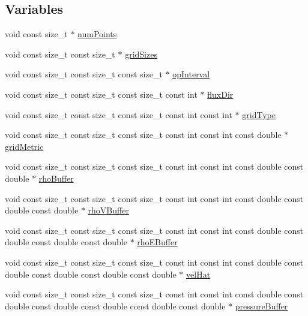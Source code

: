 \subsection*{Variables}
\begin{DoxyCompactItemize}
\item 
void const size\+\_\+t $\ast$ \hyperlink{EulerKernels_8H_a26ea64bf27e81d41692232b2b97160c3}{num\+Points}
\item 
void const size\+\_\+t const size\+\_\+t $\ast$ \hyperlink{EulerKernels_8H_a25a65154b8b8819da9bf4e0ecef40fa1}{grid\+Sizes}
\item 
void const size\+\_\+t const size\+\_\+t const size\+\_\+t $\ast$ \hyperlink{EulerKernels_8H_a213a90a5a4736a5c5fc0c0220cdcb661}{op\+Interval}
\item 
void const size\+\_\+t const size\+\_\+t const size\+\_\+t const int $\ast$ \hyperlink{EulerKernels_8H_ab29bdde281c96d3ace8c96f53cea3e7e}{flux\+Dir}
\item 
void const size\+\_\+t const size\+\_\+t const size\+\_\+t const int const int $\ast$ \hyperlink{EulerKernels_8H_af99bcb504c360b791c023e906710851c}{grid\+Type}
\item 
void const size\+\_\+t const size\+\_\+t const size\+\_\+t const int const int const double $\ast$ \hyperlink{EulerKernels_8H_a50e8052dd93fbd0508409959216200f9}{grid\+Metric}
\item 
void const size\+\_\+t const size\+\_\+t const size\+\_\+t const int const int const double const double $\ast$ \hyperlink{EulerKernels_8H_a3b7eb563e35c212b5ad0d1fdfd72d1dd}{rho\+Buffer}
\item 
void const size\+\_\+t const size\+\_\+t const size\+\_\+t const int const int const double const double const double $\ast$ \hyperlink{EulerKernels_8H_a7c23aa68122eb669ea5c4afb5a53e7cf}{rho\+V\+Buffer}
\item 
void const size\+\_\+t const size\+\_\+t const size\+\_\+t const int const int const double const double const double const double $\ast$ \hyperlink{EulerKernels_8H_a7415fc29d2ee252183df8b0d418b92af}{rho\+E\+Buffer}
\item 
void const size\+\_\+t const size\+\_\+t const size\+\_\+t const int const int const double const double const double const double const double $\ast$ \hyperlink{EulerKernels_8H_af5e2f538d36775c7fb6d1dea9380ecde}{vel\+Hat}
\item 
void const size\+\_\+t const size\+\_\+t const size\+\_\+t const int const int const double const double const double const double const double const double $\ast$ \hyperlink{EulerKernels_8H_a3f74513474f35805900c6fae145a2e22}{pressure\+Buffer}

\end{DoxyCompactItemize}
